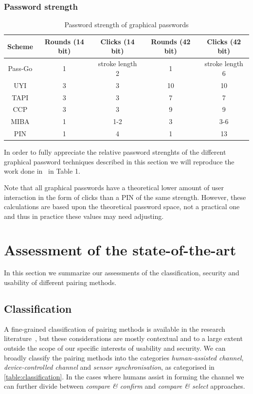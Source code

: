 \documentclass[conference, 11pt]{sty/IEEEtran}
\begin{document}
\subsubsection{Password strength}
\label{sssec:password_strength}

\begin{table}[t]
    \centering
    \normalsize{
    \begin{tabular}{c c c c c}
        Scheme & Rounds (14 bit) & Clicks (14 bit) & Rounds (42 bit) & Clicks (42 bit) \\
        \hline
        Pass-Go & 1 & stroke length 2 & 1 & stroke length 6 \\
        UYI & 3 & 3 & 10 & 10 \\
        TAPI & 3 & 3 & 7 & 7 \\
        CCP & 3 & 3 & 9 & 9 \\
        MIBA & 1 & 1-2 & 3 & 3-6 \\
        PIN & 1 & 4 & 1 & 13 \\
    \end{tabular}
    }
    \label{fig:pw}
    \caption{Password strength of graphical passwords}
\end{table}

In order to fully appreciate the relative password strenghts of the different graphical password techniques described in this section we will reproduce the work done in~\cite{schaub2013exploring} in 
Table 1.

Note that all graphical passwords have a theoretical lower amount of user interaction in the form of clicks than a PIN of the same strength.
However, these calculations are based upon the theoretical password space, not a practical one and thus in practice these values may need adjusting.

\section{Assessment of the state-of-the-art}
\label{sec:assessment_of_the_state_of_the_art}
In this section we summarize our assessments of the classification, security and usability of different pairing methods.

\subsection{Classification}
A fine-grained classification of pairing methods is available in the research literature~\cite{chong2012usability}, but these considerations are mostly contextual and to a large extent outside the scope of our specific interests of usability and security.
We can broadly classify the pairing methods into the categories \emph{human-assisted channel}, \emph{device-controlled channel} and \emph{sensor synchronisation}, as categorised in \autoref{table:classification}.
In the cases where humans assist in forming the channel we can further divide between \textit{compare \& confirm} and \textit{compare \& select} approaches.
\end{document}
